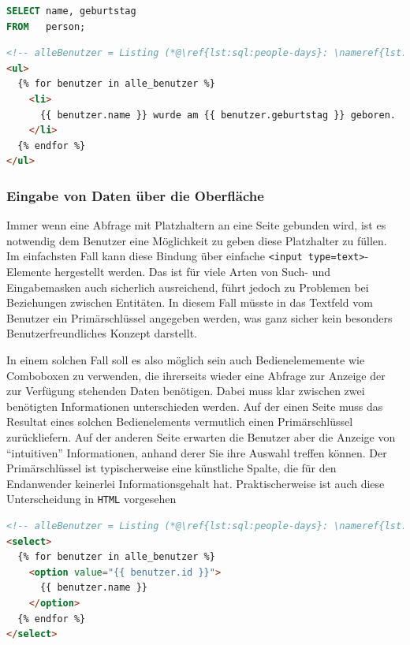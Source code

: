 \begin{lstlisting}[language=SQL, caption=Abfrage mit beliebig vielen Ergebniszeilen,label=lst:sql:people-days]
SELECT name, geburtstag
FROM   person;
\end{lstlisting}

\begin{lstlisting}[language=HTML, caption=Containerelemente mit Kindern, label=lst:html:people-days]
<!-- alleBenutzer = Listing (*@\ref{lst:sql:people-days}: \nameref{lst:sql:people-days}@*) -->
<ul>
  {% for benutzer in alle_benutzer %}
    <li>
      {{ benutzer.name }} wurde am {{ benutzer.geburtstag }} geboren.
    </li>
  {% endfor %}
</ul>
\end{lstlisting}

\subsubsection{Eingabe von Daten über die Oberfläche}
\label{sec:design-ui-bind-input}

Immer wenn eine Abfrage mit Platzhaltern an eine Seite gebunden wird, ist es notwendig dem Benutzer eine Möglichkeit zu geben diese Platzhalter zu füllen. Im einfachsten Fall kann diese Bindung über einfache \texttt{<input type=text>}-Elemente hergestellt werden. Das ist für viele Arten von Such- und Eingabemasken auch sicherlich ausreichend, führt jedoch zu Problemen bei Beziehungen zwischen Entitäten. In diesem Fall müsste in das Textfeld vom Benutzer ein Primärschlüssel angegeben werden, was ganz sicher kein besonders Benutzerfreundliches Konzept darstellt.

In einem solchen Fall soll es also möglich sein auch Bedienelememente wie Comboboxen zu verwenden, die ihrerseits wieder eine Abfrage zur Anzeige der zur Verfügung stehenden Daten benötigen. Dabei muss klar zwischen zwei benötigten Informationen unterschieden werden. Auf der einen Seite muss das Resultat eines solchen Bedienelements vermutlich einen Primärschlüssel zurückliefern. Auf der anderen Seite erwarten die Benutzer aber die Anzeige von ``intuitiven'' Informationen, anhand derer Sie ihre Auswahl treffen können. Der Primärschlüssel ist typischerweise eine künstliche Spalte, die für den Endanwender keinerlei Informationsgehalt hat. Praktischerweise ist auch diese Unterscheidung in \texttt{HTML} vorgesehen

\begin{lstlisting}[float,language=HTML, caption=Containerelemente mit Kindern, label=lst:html:select-example]
<!-- alleBenutzer = Listing (*@\ref{lst:sql:people-days}: \nameref{lst:sql:people-days}@*) -->
<select>
  {% for benutzer in alle_benutzer %}
    <option value="{{ benutzer.id }}">
      {{ benutzer.name }}
    </option>
  {% endfor %}
</select>
\end{lstlisting}

